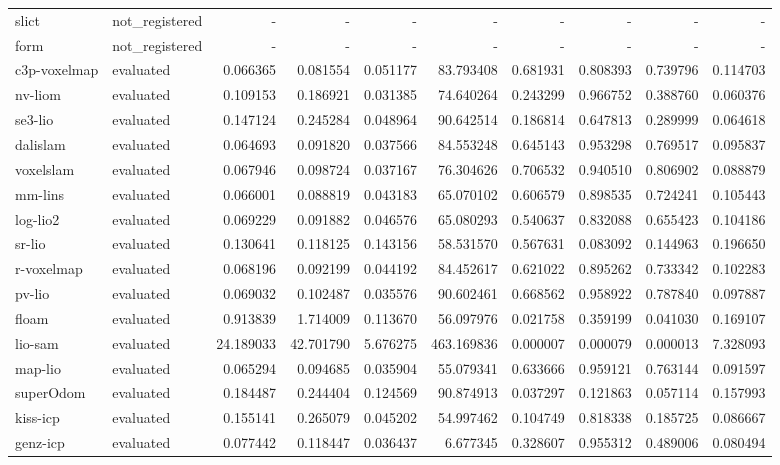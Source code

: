 \documentclass{article}
\begin{document}
\begin{table}[htbp]
\begin{tabular}{llrrrrrrrr}
slict & not\_registered & - & - & - & - & - & - & - & - \\
form & not\_registered & - & - & - & - & - & - & - & - \\
c3p-voxelmap & evaluated & 0.066365 & 0.081554 & 0.051177 & 83.793408 & 0.681931 & 0.808393 & 0.739796 & 0.114703 \\
nv-liom & evaluated & 0.109153 & 0.186921 & 0.031385 & 74.640264 & 0.243299 & 0.966752 & 0.388760 & 0.060376 \\
se3-lio & evaluated & 0.147124 & 0.245284 & 0.048964 & 90.642514 & 0.186814 & 0.647813 & 0.289999 & 0.064618 \\
dalislam & evaluated & 0.064693 & 0.091820 & 0.037566 & 84.553248 & 0.645143 & 0.953298 & 0.769517 & 0.095837 \\
voxelslam & evaluated & 0.067946 & 0.098724 & 0.037167 & 76.304626 & 0.706532 & 0.940510 & 0.806902 & 0.088879 \\
mm-lins & evaluated & 0.066001 & 0.088819 & 0.043183 & 65.070102 & 0.606579 & 0.898535 & 0.724241 & 0.105443 \\
log-lio2 & evaluated & 0.069229 & 0.091882 & 0.046576 & 65.080293 & 0.540637 & 0.832088 & 0.655423 & 0.104186 \\
sr-lio & evaluated & 0.130641 & 0.118125 & 0.143156 & 58.531570 & 0.567631 & 0.083092 & 0.144963 & 0.196650 \\
r-voxelmap & evaluated & 0.068196 & 0.092199 & 0.044192 & 84.452617 & 0.621022 & 0.895262 & 0.733342 & 0.102283 \\
pv-lio & evaluated & 0.069032 & 0.102487 & 0.035576 & 90.602461 & 0.668562 & 0.958922 & 0.787840 & 0.097887 \\
floam & evaluated & 0.913839 & 1.714009 & 0.113670 & 56.097976 & 0.021758 & 0.359199 & 0.041030 & 0.169107 \\
lio-sam & evaluated & 24.189033 & 42.701790 & 5.676275 & 463.169836 & 0.000007 & 0.000079 & 0.000013 & 7.328093 \\
map-lio & evaluated & 0.065294 & 0.094685 & 0.035904 & 55.079341 & 0.633666 & 0.959121 & 0.763144 & 0.091597 \\
superOdom & evaluated & 0.184487 & 0.244404 & 0.124569 & 90.874913 & 0.037297 & 0.121863 & 0.057114 & 0.157993 \\
kiss-icp & evaluated & 0.155141 & 0.265079 & 0.045202 & 54.997462 & 0.104749 & 0.818338 & 0.185725 & 0.086667 \\
genz-icp & evaluated & 0.077442 & 0.118447 & 0.036437 & 6.677345 & 0.328607 & 0.955312 & 0.489006 & 0.080494 \\

\end{tabular}
\end{table}
\end{document}
